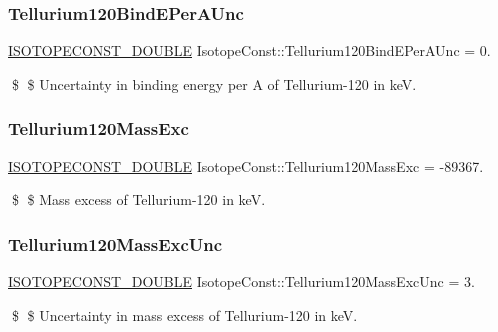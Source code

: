 \subsubsection{\texorpdfstring{Tellurium120\+Bind\+E\+Per\+A\+Unc}{Tellurium120BindEPerAUnc}}
{\footnotesize\ttfamily \mbox{\hyperlink{group___isotope_const-_macros_ga8f45a7272ce02c0b4c65c44636ed719a}{I\+S\+O\+T\+O\+P\+E\+C\+O\+N\+S\+T\+\_\+\+D\+O\+U\+B\+LE}} Isotope\+Const\+::\+Tellurium120\+Bind\+E\+Per\+A\+Unc = 0.}

\$ \$ Uncertainty in binding energy per A of Tellurium-\/120 in keV. \mbox{\label{group___isotope_const-_tellurium-_te120_gaea46340615ca80fb2f7465399634c640}} 
\subsubsection{\texorpdfstring{Tellurium120\+Mass\+Exc}{Tellurium120MassExc}}
{\footnotesize\ttfamily \mbox{\hyperlink{group___isotope_const-_macros_ga8f45a7272ce02c0b4c65c44636ed719a}{I\+S\+O\+T\+O\+P\+E\+C\+O\+N\+S\+T\+\_\+\+D\+O\+U\+B\+LE}} Isotope\+Const\+::\+Tellurium120\+Mass\+Exc = -\/89367.}

\$ \$ Mass excess of Tellurium-\/120 in keV. \mbox{\label{group___isotope_const-_tellurium-_te120_ga7e38cc98fbfa6e35d1840da796accb8e}} 
\subsubsection{\texorpdfstring{Tellurium120\+Mass\+Exc\+Unc}{Tellurium120MassExcUnc}}
{\footnotesize\ttfamily \mbox{\hyperlink{group___isotope_const-_macros_ga8f45a7272ce02c0b4c65c44636ed719a}{I\+S\+O\+T\+O\+P\+E\+C\+O\+N\+S\+T\+\_\+\+D\+O\+U\+B\+LE}} Isotope\+Const\+::\+Tellurium120\+Mass\+Exc\+Unc = 3.}

\$ \$ Uncertainty in mass excess of Tellurium-\/120 in keV. \mbox{\label{group___isotope_const-_tellurium-_te120_ga91b9744188b0d1384f86371cca70c21e}} 

